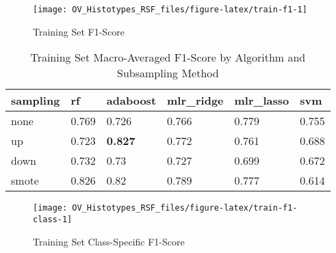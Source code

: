 \documentclass[
]{report}
\begin{document}
\begin{figure}[H]

{\centering \texttt{[image: OV\_Histotypes\_RSF\_files/figure-latex/train-f1-1]} 

}

\caption{Training Set F1-Score}\label{fig:train-f1}
\end{figure}

\begin{table}

\caption{\label{tab:train-f1-table}Training Set Macro-Averaged F1-Score by Algorithm and Subsampling Method}
\centering
\begin{tabular}[t]{l|l|l|l|l|l}
\hline
sampling & rf & adaboost & mlr\_ridge & mlr\_lasso & svm\\
\hline
none & 0.769 & 0.726 & 0.766 & 0.779 & 0.755\\
\hline
up & 0.723 & \textbf{0.827} & 0.772 & 0.761 & 0.688\\
\hline
down & 0.732 & 0.73 & 0.727 & 0.699 & 0.672\\
\hline
smote & 0.826 & 0.82 & 0.789 & 0.777 & 0.614\\
\hline
\end{tabular}
\end{table}

\begin{figure}[H]

{\centering \texttt{[image: OV\_Histotypes\_RSF\_files/figure-latex/train-f1-class-1]} 

}

\caption{Training Set Class-Specific F1-Score}\label{fig:train-f1-class}
\end{figure}
\end{document}
